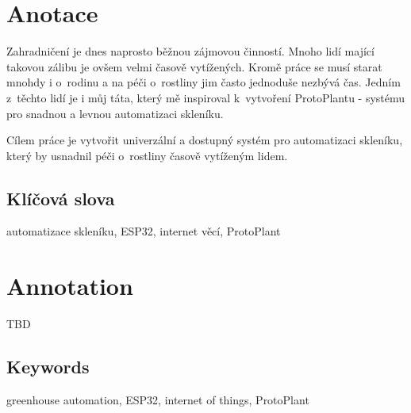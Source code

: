 \documentclass{template/socthesis}
\author{Petr Štourač}
\begin{document}
\maketitle



\pagestyle{empty}

\section*{Anotace}
Zahradničení je dnes naprosto běžnou zájmovou činností. Mnoho lidí mající takovou zálibu je ovšem velmi časově vytížených. Kromě práce se musí starat mnohdy i o~rodinu a na péči o~rostliny jim často jednoduše nezbývá čas. Jedním z~těchto lidí je i můj táta, který mě inspiroval k~vytvoření ProtoPlantu - systému pro snadnou a levnou automatizaci skleníku. 

Cílem práce je vytvořit univerzální a dostupný systém pro automatizaci skleníku, který by usnadnil péči o~rostliny časově vytíženým lidem. 

\subsection*{Klíčová slova}
automatizace skleníku, ESP32, internet věcí, ProtoPlant 

\vspace{20mm}

\section*{Annotation}
TBD

\subsection*{Keywords}
greenhouse automation, ESP32, internet of things, ProtoPlant

\newpage
\pagestyle{plain}

\tableofcontents %

\setcounter{figure}{0}
\setcounter{table}{0}
\newpage


\end{document}
